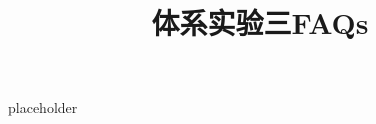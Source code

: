 \documentclass{article}
\title{\textbf{体系实验三FAQs}\vspace{-2em}}
\author{}
\date{}
\begin{document}
\maketitle

placeholder
\end{document}
